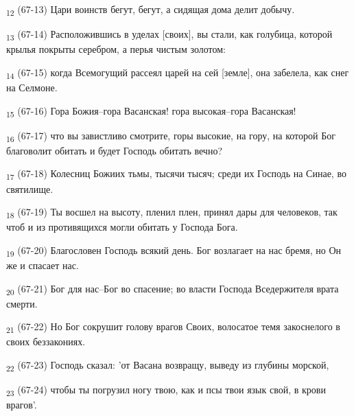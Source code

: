 \begin{tcolorbox}
\textsubscript{12} (67-13) Цари воинств бегут, бегут, а сидящая дома делит добычу.
\end{tcolorbox}
\begin{tcolorbox}
\textsubscript{13} (67-14) Расположившись в уделах [своих], вы стали, как голубица, которой крылья покрыты серебром, а перья чистым золотом:
\end{tcolorbox}
\begin{tcolorbox}
\textsubscript{14} (67-15) когда Всемогущий рассеял царей на сей [земле], она забелела, как снег на Селмоне.
\end{tcolorbox}
\begin{tcolorbox}
\textsubscript{15} (67-16) Гора Божия--гора Васанская! гора высокая--гора Васанская!
\end{tcolorbox}
\begin{tcolorbox}
\textsubscript{16} (67-17) что вы завистливо смотрите, горы высокие, на гору, на которой Бог благоволит обитать и будет Господь обитать вечно?
\end{tcolorbox}
\begin{tcolorbox}
\textsubscript{17} (67-18) Колесниц Божиих тьмы, тысячи тысяч; среди их Господь на Синае, во святилище.
\end{tcolorbox}
\begin{tcolorbox}
\textsubscript{18} (67-19) Ты восшел на высоту, пленил плен, принял дары для человеков, так чтоб и из противящихся могли обитать у Господа Бога.
\end{tcolorbox}
\begin{tcolorbox}
\textsubscript{19} (67-20) Благословен Господь всякий день. Бог возлагает на нас бремя, но Он же и спасает нас.
\end{tcolorbox}
\begin{tcolorbox}
\textsubscript{20} (67-21) Бог для нас--Бог во спасение; во власти Господа Вседержителя врата смерти.
\end{tcolorbox}
\begin{tcolorbox}
\textsubscript{21} (67-22) Но Бог сокрушит голову врагов Своих, волосатое темя закоснелого в своих беззакониях.
\end{tcolorbox}
\begin{tcolorbox}
\textsubscript{22} (67-23) Господь сказал: 'от Васана возвращу, выведу из глубины морской,
\end{tcolorbox}
\begin{tcolorbox}
\textsubscript{23} (67-24) чтобы ты погрузил ногу твою, как и псы твои язык свой, в крови врагов'.
\end{tcolorbox}
